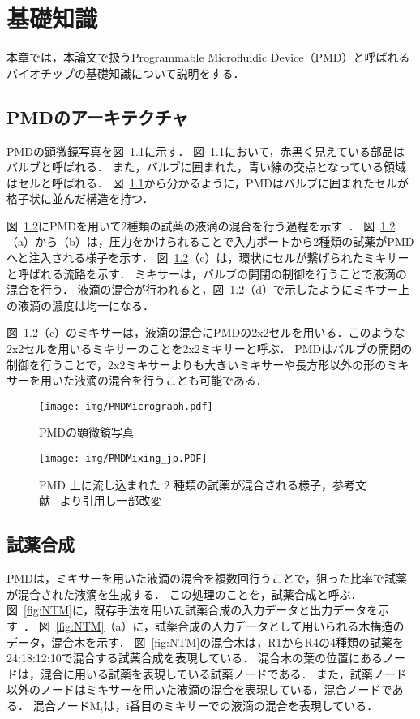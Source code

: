 \chapter{基礎知識}
本章では，本論文で扱うProgrammable Microfluidic Device（PMD）と呼ばれるバイオチップの基礎知識について説明をする．

\section{PMDのアーキテクチャ}
PMDの顕微鏡写真を図~\ref{fig:PMDMicrograph}に示す．
図~\ref{fig:PMDMicrograph}において，赤黒く見えている部品はバルブと呼ばれる．
また，バルブに囲まれた，青い線の交点となっている領域はセルと呼ばれる．
図~\ref{fig:PMDMicrograph}から分かるように，PMDはバルブに囲まれたセルが格子状に並んだ構造を持つ．

図~\ref{fig:MixingOnPMD}にPMDを用いて2種類の試薬の液滴の混合を行う過程を示す~\cite{4}．
図~\ref{fig:MixingOnPMD}（a）から（b）は，圧力をかけられることで入力ポートから2種類の試薬がPMDへと注入される様子を示す．
図~\ref{fig:MixingOnPMD}（c）は，環状にセルが繋げられたミキサーと呼ばれる流路を示す．
ミキサーは，バルブの開閉の制御を行うことで液滴の混合を行う．
液滴の混合が行われると，図~\ref{fig:MixingOnPMD}（d）で示したようにミキサー上の液滴の濃度は均一になる．

図~\ref{fig:MixingOnPMD}（c）のミキサーは，液滴の混合にPMDの2x2セルを用いる．このような2x2セルを用いるミキサーのことを2x2ミキサーと呼ぶ．
PMDはバルブの開閉の制御を行うことで，2x2ミキサーよりも大きいミキサーや長方形以外の形のミキサーを用いた液滴の混合を行うことも可能である．

\begin{figure}[tbp]
 \centering\texttt{[image: img/PMDMicrograph.pdf]}
 \caption{PMDの顕微鏡写真}\label{fig:PMDMicrograph}
\end{figure}

\begin{figure}[tbp]
    \centering\texttt{[image: img/PMDMixing\_jp.PDF]}
    \caption{PMD 上に流し込まれた 2 種類の試薬が混合される様子，参考文献~\cite{4} より引用し一部改変}\label{fig:MixingOnPMD}
\end{figure}

\section{試薬合成}
PMDは，ミキサーを用いた液滴の混合を複数回行うことで，狙った比率で試薬が混合された液滴を生成する．
この処理のことを，試薬合成と呼ぶ．図~\ref{fig:NTM}に，既存手法を用いた試薬合成の入力データと出力データを示す~\cite{10089903}．
図~\ref{fig:NTM}（a）に，試薬合成の入力データとして用いられる木構造のデータ，混合木を示す．
図~\ref{fig:NTM}の混合木は，R1からR4の4種類の試薬を24:18:12:10で混合する試薬合成を表現している．
混合木の葉の位置にあるノードは，混合に用いる試薬を表現している試薬ノードである．
また，試薬ノード以外のノードはミキサーを用いた液滴の混合を表現している，混合ノードである．
混合ノードM$_i$は，i番目のミキサーでの液滴の混合を表現している．


